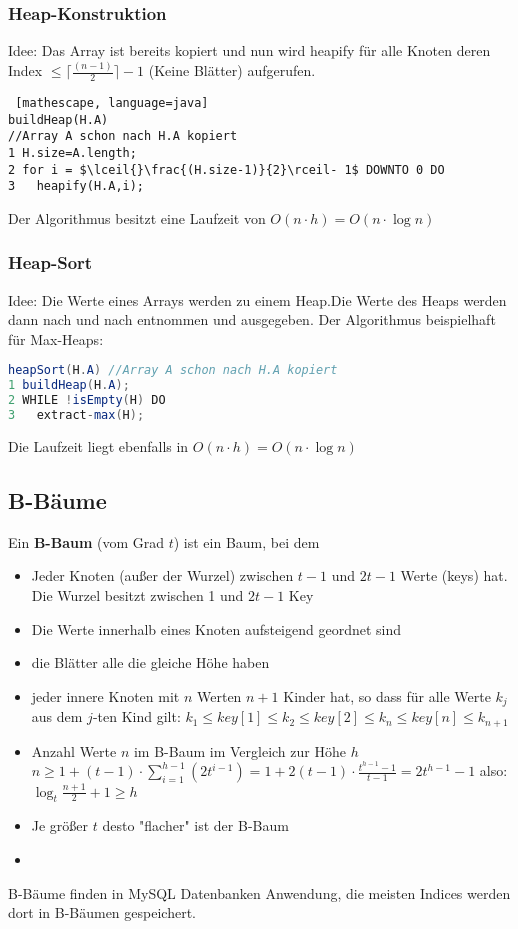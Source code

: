 \documentclass[jou,apacite]{apa6}
\begin{document}
\subsubsection{Heap-Konstruktion}
Idee: Das Array ist bereits kopiert und nun wird heapify für alle Knoten deren Index $\leq \lceil{}\frac{(n-1)}{2}\rceil-1$ (Keine Blätter) aufgerufen.
\begin{lstlisting} [mathescape, language=java]
buildHeap(H.A) 
//Array A schon nach H.A kopiert
1 H.size=A.length;
2 for i = $\lceil{}\frac{(H.size-1)}{2}\rceil- 1$ DOWNTO 0 DO
3   heapify(H.A,i);
\end{lstlisting}
Der Algorithmus besitzt eine Laufzeit von $O(n \cdot h) = O(n \cdot \log n)$
\subsubsection{Heap-Sort}
Idee: Die Werte eines Arrays werden zu einem Heap.Die Werte des Heaps werden dann nach und nach entnommen und ausgegeben.
Der Algorithmus beispielhaft für Max-Heaps:
\begin{lstlisting}[language=java]
heapSort(H.A) //Array A schon nach H.A kopiert
1 buildHeap(H.A);
2 WHILE !isEmpty(H) DO 
3   extract-max(H);
\end{lstlisting}
Die Laufzeit liegt ebenfalls in $O(n\cdot h)= O(n\cdot\log n)$

\subsection{B-Bäume}
Ein {\bfseries B-Baum} (vom Grad $t$) ist ein Baum, bei dem
\begin{itemize}
    \item Jeder Knoten (außer der Wurzel) zwischen $t-1$ und $2t-1$ Werte (keys) hat. Die Wurzel besitzt zwischen 1 und $2t-1$ Key
    \item Die Werte innerhalb eines Knoten aufsteigend geordnet sind
    \item die Blätter alle die gleiche Höhe haben
    \item jeder innere Knoten mit $n$ Werten $n+1$ Kinder hat, so dass für alle Werte $k_j$ aus dem $j$-ten Kind gilt: $k_1 \leq key[1] \leq k_2 \leq key[2] \leq k_n \leq key[n] \leq k_{n+1}$
    \item Anzahl Werte $n$ im B-Baum im Vergleich zur Höhe $h$ $n \geq 1 + (t-1) \cdot \sum_{i=1}^{h-1}(2t^{i-1}) = 1+ 2(t-1)\cdot \frac{t^{h-1}-1}{t-1} = 2t^{h-1}-1$ also: $\log_{t}\frac{n+1}{2} + 1 \geq h$
    \item Je größer $t$ desto "flacher" ist der B-Baum
    \item 
\end{itemize}
B-Bäume finden in MySQL Datenbanken Anwendung, die meisten Indices werden dort in B-Bäumen gespeichert.
\end{document}
